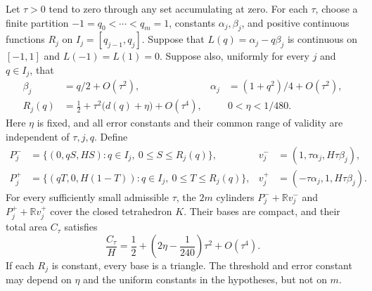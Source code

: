\begin{theorem}
\label{ext:general-cap}
Let $\tau>0$ tend to zero through any set accumulating at zero.
For each $\tau$, choose a finite partition
$-1=q_0<\cdots<q_m=1$, constants $\alpha_j,\beta_j$, and positive
continuous functions $R_j$ on $I_j=[q_{j-1},q_j]$.
Suppose that $L(q)=\alpha_j-q\beta_j$ is continuous on $[-1,1]$
and $L(-1)=L(1)=0$.  Suppose also, uniformly for every $j$ and
$q\in I_j$, that
\begin{align}
 \beta_j&=q/2+O(\tau^2),&
 \alpha_j&=(1+q^2)/4+O(\tau^2),\label{ext:coefficient-hypotheses}\\
 R_j(q)&=\tfrac12+\tau^2\bigl(d(q)+\eta\bigr)+O(\tau^4),
 &&0<\eta<1/480.\label{ext:cap-hypothesis}
\end{align}
Here $\eta$ is fixed, and all error constants and their common range of
validity are independent of $\tau,j,q$.
Define
\begin{align*}
 P_j^-&=\{(0,qS,HS):q\in I_j,\ 0\le S\le R_j(q)\},&
 v_j^-&=(1,\tau\alpha_j,H\tau\beta_j),\\
 P_j^+&=\{(qT,0,H(1-T)):q\in I_j,\ 0\le T\le R_j(q)\},&
 v_j^+&=(-\tau\alpha_j,1,H\tau\beta_j).
\end{align*}
For every sufficiently small admissible $\tau$, the $2m$ cylinders
$P_j^-+\mathbb Rv_j^-$ and $P_j^++\mathbb Rv_j^+$ cover the closed
tetrahedron $K$.  Their bases are compact, and their total area $C_\tau$
satisfies
\begin{equation}\label{ext:general-cost}
 \frac{C_\tau}{H}
 =\frac12+\left(2\eta-\frac1{240}\right)\tau^2+O(\tau^4).
\end{equation}
If each $R_j$ is constant, every base is a triangle.
The threshold and error constant may depend on $\eta$ and the uniform
constants in the hypotheses, but not on $m$.
\end{theorem}

